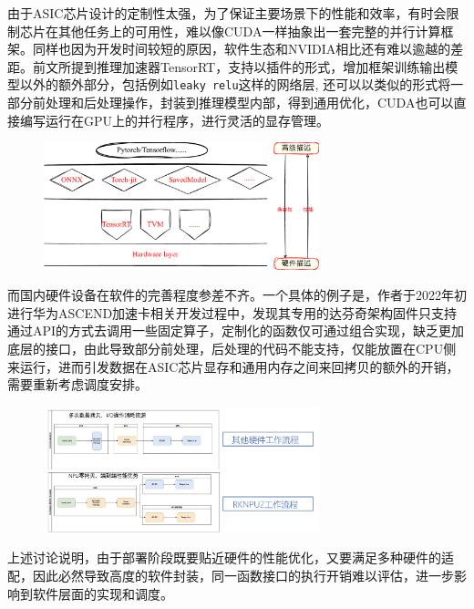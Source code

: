 \documentclass[master,anonymous]{shtthesis}
\begin{document}
由于ASIC芯片设计的定制性太强，为了保证主要场景下的性能和效率，有时会限制芯片在其他任务上的可用性，难以像CUDA一样抽象出一套完整的并行计算框架。同样也因为开发时间较短的原因，软件生态和NVIDIA相比还有难以逾越的差距。前文所提到推理加速器TensorRT，支持以插件的形式，增加框架训练输出模型以外的额外部分，包括例如\verb|leaky relu|\cite{xu2015empirical}这样的网络层, 还可以以类似的形式将一部分前处理和后处理操作，封装到推理模型内部，得到通用优化，CUDA也可以直接编写运行在GPU上的并行程序，进行灵活的显存管理。

\begin{figure}[htbp]
	\centering
	\includegraphics[width=8cm]{img/4.pdf}
	\label{视觉算法模型的兼容性和性能权衡}
\end{figure}

而国内硬件设备在软件的完善程度参差不齐。一个具体的例子是，作者于2022年初进行华为ASCEND加速卡相关开发过程中，发现其专用的达芬奇架构固件只支持通过API的方式去调用一些固定算子，定制化的函数仅可通过组合实现，缺乏更加底层的接口，由此导致部分前处理，后处理的代码不能支持，仅能放置在CPU侧来运行，进而引发数据在ASIC芯片显存和通用内存之间来回拷贝的额外的开销，需要重新考虑调度安排。
\begin{figure}[htbp]
	\centering
	\includegraphics[width=8cm]{img/rknn_support.jpeg}
	\label{rknn-support}
\end{figure}

上述讨论说明，由于部署阶段既要贴近硬件的性能优化，又要满足多种硬件的适配，因此必然导致高度的软件封装，同一函数接口的执行开销难以评估，进一步影响到软件层面的实现和调度。
\end{document}

